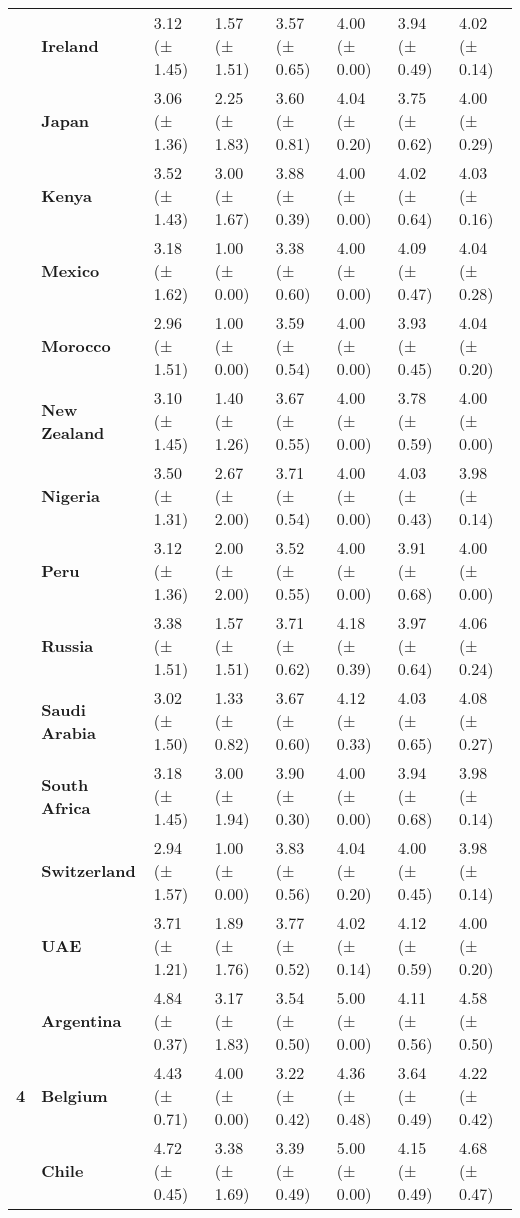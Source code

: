 \begin{longtable}{llllllll}
\textbf{} & \textbf{Ireland} & 3.12 (± 1.45) & 1.57 (± 1.51) & 3.57 (± 0.65) & 4.00 (± 0.00) & 3.94 (± 0.49) & 4.02 (± 0.14) \\
\textbf{} & \textbf{Japan} & 3.06 (± 1.36) & 2.25 (± 1.83) & 3.60 (± 0.81) & 4.04 (± 0.20) & 3.75 (± 0.62) & 4.00 (± 0.29) \\
\textbf{} & \textbf{Kenya} & 3.52 (± 1.43) & 3.00 (± 1.67) & 3.88 (± 0.39) & 4.00 (± 0.00) & 4.02 (± 0.64) & 4.03 (± 0.16) \\
\textbf{} & \textbf{Mexico} & 3.18 (± 1.62) & 1.00 (± 0.00) & 3.38 (± 0.60) & 4.00 (± 0.00) & 4.09 (± 0.47) & 4.04 (± 0.28) \\
\textbf{} & \textbf{Morocco} & 2.96 (± 1.51) & 1.00 (± 0.00) & 3.59 (± 0.54) & 4.00 (± 0.00) & 3.93 (± 0.45) & 4.04 (± 0.20) \\
\textbf{} & \textbf{New Zealand} & 3.10 (± 1.45) & 1.40 (± 1.26) & 3.67 (± 0.55) & 4.00 (± 0.00) & 3.78 (± 0.59) & 4.00 (± 0.00) \\
\textbf{} & \textbf{Nigeria} & 3.50 (± 1.31) & 2.67 (± 2.00) & 3.71 (± 0.54) & 4.00 (± 0.00) & 4.03 (± 0.43) & 3.98 (± 0.14) \\
\textbf{} & \textbf{Peru} & 3.12 (± 1.36) & 2.00 (± 2.00) & 3.52 (± 0.55) & 4.00 (± 0.00) & 3.91 (± 0.68) & 4.00 (± 0.00) \\
\textbf{} & \textbf{Russia} & 3.38 (± 1.51) & 1.57 (± 1.51) & 3.71 (± 0.62) & 4.18 (± 0.39) & 3.97 (± 0.64) & 4.06 (± 0.24) \\
\textbf{} & \textbf{Saudi Arabia} & 3.02 (± 1.50) & 1.33 (± 0.82) & 3.67 (± 0.60) & 4.12 (± 0.33) & 4.03 (± 0.65) & 4.08 (± 0.27) \\
\textbf{} & \textbf{South Africa} & 3.18 (± 1.45) & 3.00 (± 1.94) & 3.90 (± 0.30) & 4.00 (± 0.00) & 3.94 (± 0.68) & 3.98 (± 0.14) \\
\textbf{} & \textbf{Switzerland} & 2.94 (± 1.57) & 1.00 (± 0.00) & 3.83 (± 0.56) & 4.04 (± 0.20) & 4.00 (± 0.45) & 3.98 (± 0.14) \\
\textbf{} & \textbf{UAE} & 3.71 (± 1.21) & 1.89 (± 1.76) & 3.77 (± 0.52) & 4.02 (± 0.14) & 4.12 (± 0.59) & 4.00 (± 0.20) \\
\cline{1-8}
\multirow[t]{19}{*}{\textbf{4}} & \textbf{Argentina} & 4.84 (± 0.37) & 3.17 (± 1.83) & 3.54 (± 0.50) & 5.00 (± 0.00) & 4.11 (± 0.56) & 4.58 (± 0.50) \\
\textbf{} & \textbf{Belgium} & 4.43 (± 0.71) & 4.00 (± 0.00) & 3.22 (± 0.42) & 4.36 (± 0.48) & 3.64 (± 0.49) & 4.22 (± 0.42) \\
\textbf{} & \textbf{Chile} & 4.72 (± 0.45) & 3.38 (± 1.69) & 3.39 (± 0.49) & 5.00 (± 0.00) & 4.15 (± 0.49) & 4.68 (± 0.47) \\

\end{longtable}
